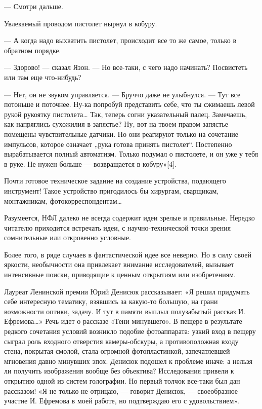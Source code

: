 — Смотри дальше.

Увлекаемый проводом пистолет нырнул в кобуру.

— А когда надо  выхватить пистолет, происходит все  то же самое, только  в
обратном порядке.

— Здорово! — сказал Язон. — Но все-таки, с чего надо начинать?  Посвистеть
или там еще что-нибудь?

— Нет, он не  звуком управляется. —  Бруччо даже не  улыбнулся. — Тут  все
потоньше и  поточнее. Ну-ка  попробуй представить  себе, что  ты  сжимаешь
левой рукой  рукоятку пистолета…  Так,  теперь согни  указательный  палец.
Замечаешь, как напряглись сухожилия  в запястье? Ну,  вот на твоем  правом
запястье помещены  чувствительные  датчики.  Но они  реагируют  только  на
сочетание импульсов,  которое  означает „рука  готова  принять  пистолет“.
Постепенно вырабатывается полный автоматизм. Только подумал о пистолете, и
он уже у тебя в руке. Не нужен больше — возвращается в кобуру»[4].

Почти  готовое  техническое  задание  на  создание  устройства,  подающего
инструмент!  Такое   устройство   пригодилось  бы   хирургам,   сварщикам,
монтажникам, фотокорреспондентам…

Разумеется, НФЛ  далеко  не  всегда содержит  идеи  зрелые  и  правильные.
Нередко читателю  приходится  встречать идеи,  с  научно-технической  точки
зрения сомнительные или откровенно условные.

Более того, в ряде  случаев в фантастической идее  все неверно. Но в  силу
своей  яркости,  необычности   она  привлекает  внимание   исследователей,
вызывает  интенсивные   поиски,   приводящие  к   ценным   открытиям   или
изобретениям.

Лауреат Ленинской  премии Юрий  Денисюк рассказывает:  «Я решил  придумать
себе  интересную  тематику,  взявшись   за  какую-то  большую,  на   грани
возможности оптики, задачу. И тут  в памяти выплыл полузабытый рассказ  И.
Ефремова…» Речь идет о  рассказе «Тени минувшего».  В пещере в  результате
редкого сочетания  условий возникло  подобие  фотоаппарата: узкий  вход  в
пещеру сыграл роль  входного отверстия  камеры-обскуры, а  противоположная
входу стена, покрытая смолой, стала огромной фотопластинкой, запечатлевшей
мгновения давно минувших эпох. Денисюк подошел к проблеме иначе: а  нельзя
ли получить  изображения  вообще  без объектива?  Исследования  привели  к
открытию одной  из систем  голографии. Но  первый толчок  все-таки был  дан
рассказом! «Я  не только  не отрицаю,  — говорит  Денисюк, —  своеобразное
участие И. Ефремова в моей работе, но подтверждаю его с удовольствием».

